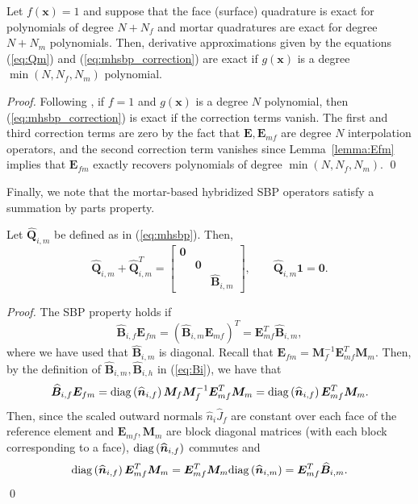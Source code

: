 \documentclass{svjour3}                     %
\renewcommand{\hat}{\widehat}
\newcommand{\diag}[1]{{\rm diag}\LRp{#1}}
\newcommand{\LRp}[1]{\left( #1 \right)}
\begin{document}
\begin{lemma}
Let $f(\bm{x}) = 1$ and suppose that the face (surface) quadrature is exact for polynomials of degree $N+N_f$ and mortar quadratures are exact for degree $N+N_m$ polynomials.  Then, derivative approximations given by the equations (\ref{eq:Qm}) and (\ref{eq:mhsbp_correction}) are exact if $g(\bm{x})$ is a degree $\min(N,N_f,N_m)$ polynomial.
\end{lemma}
\begin{proof}
Following \cite{chan2017discretely}, if $f = 1$  and $g(\bm{x})$ is a degree $N$ polynomial, then  (\ref{eq:mhsbp_correction}) is exact if the correction terms vanish.  The first and third correction terms are zero by the fact that $\bm{E}, \bm{E}_{mf}$ are degree $N$ interpolation operators, and the second correction term vanishes since Lemma~\ref{lemma:Efm} implies that $\bm{E}_{fm}$ exactly recovers polynomials of degree $\min(N,N_f,N_m)$.
\qed\end{proof}

Finally, we note that the mortar-based hybridized SBP operators satisfy a summation by parts property.
\begin{lemma}
\label{lemma:mhsbp}
Let $\hat{\bm{Q}}_{i,m}$ be defined as in (\ref{eq:mhsbp}).  Then, 
\[
\hat{\bm{Q}}_{i,m} + \hat{\bm{Q}}_{i,m}^T = \begin{bmatrix}
\bm{0} && \\
&\bm{0} &\\
&& \hat{\bm{B}}_{i,m}\end{bmatrix}, \qquad \hat{\bm{Q}}_{i,m}\bm{1} = \bm{0}.
\]
\end{lemma}
\begin{proof}
The SBP property holds if 
\begin{equation}
\hat{\bm{B}}_{i,f} \bm{E}_{fm} = (\hat{\bm{B}}_{i,m} \bm{E}_{mf})^T = \bm{E}_{mf}^T\hat{\bm{B}}_{i,m},  
\label{eq:mhsbpprop}
\end{equation}
where we have used that $\hat{\bm{B}}_{i,m}$ is diagonal.  Recall that $\bm{E}_{fm} = \bm{M}_f^{-1}\bm{E}_{mf}^T\bm{M}_m$.  
Then, by the definition of $\hat{\bm{B}}_{i,m}, \hat{\bm{B}}_{i,h}$ in (\ref{eq:Bi}), we have that
\begin{align*}
\hat{\bm{B}}_{i,f} \bm{E}_{fm} = \diag{\hat{\bm{n}}_{i,f}}\bm{M}_f \bm{M}_f^{-1} \bm{E}_{mf}^T\bm{M}_m 
= \diag{\hat{\bm{n}}_{i,f}} \bm{E}_{mf}^T\bm{M}_m.
\end{align*}
Then, since the scaled outward normals $\hat{n}_i\hat{J}_f$  are constant over each face of the reference element and $\bm{E}_{mf}, \bm{M}_m$ are block diagonal matrices (with each block corresponding to a face), $\diag{\hat{\bm{n}}_{i,f}}$ commutes and 
\[
\diag{\hat{\bm{n}}_{i,f}} \bm{E}_{mf}^T\bm{M}_m =\bm{E}_{mf}^T\bm{M}_m \diag{\hat{\bm{n}}_{i,m}}= \bm{E}_{mf}^T\hat{\bm{B}}_{i,m}.
\]  
\qed\end{proof}
\end{document}
